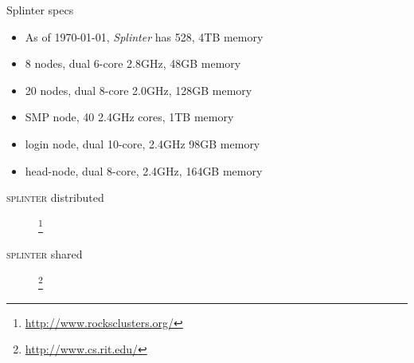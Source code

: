 \documentclass{beamer}
\begin{document}
\begin{frame}{Splinter specs}
	\begin{itemize}
		\item As of \today, \emph{Splinter} has 528, 4TB memory
		\item 8 nodes, dual 6-core 2.8GHz, 48GB memory 
		\item 20 nodes, dual 8-core 2.0GHz, 128GB memory
		\item SMP node, 40 2.4GHz cores, 1TB memory
		\item login node, dual 10-core, 2.4GHz 98GB memory
		\item head-node, dual 8-core, 2.4GHz, 164GB memory
	\end{itemize}
\end{frame}

\begin{frame}{\textsc{splinter} distributed}
  \begin{figure}
    \begin{center}
      \footnote{\url{http://www.rocksclusters.org/}}
    \end{center}
  \end{figure}
\end{frame}

\begin{frame}{\textsc{splinter} shared}
  \begin{figure}
    \begin{center}
      \footnote{\url{http://www.cs.rit.edu/}}
    \end{center}
  \end{figure}
\end{frame}
\end{document}
